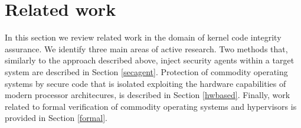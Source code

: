












\clearpage

\section{Related work}\label{hf:related}
In this section we review related work in the domain of kernel code integrity assurance. We identify three main areas of active research. Two methods that, similarly to the approach described above, inject security agents within a target system are described in Section \ref{secagent}. Protection of commodity operating systems by secure code that is isolated exploiting the hardware capabilities of modern processor architecures, is described in Section \ref{hwbased}. Finally, work related to formal verification of commodity operating systems and hypervisors is provided in Section \ref{formal}.

